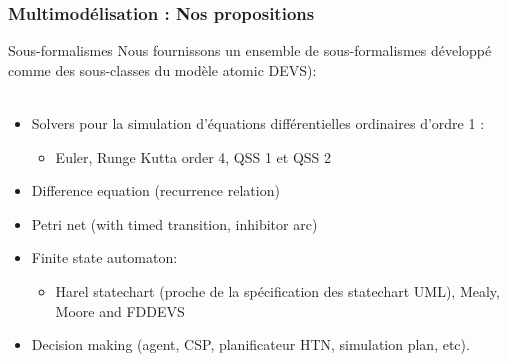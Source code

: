 \documentclass[xetex, compress, table, dvipsnames]{beamer}
\begin{document}
\begin{frame}
  \frametitle{Multimodélisation : Nos propositions}
  \begin{block}{Sous-formalismes}
    Nous fournissons un ensemble de sous-formalismes développé comme
    des sous-classes du modèle atomic DEVS):\\~\\
    \begin{itemize}
    \item Solvers pour la \alert{simulation d'équations
        différentielles ordinaires d'ordre 1} :
      \begin{itemize}
      \item Euler, Runge Kutta order 4, QSS 1 et QSS 2
      \end{itemize}
    \item \alert{Difference equation} (recurrence relation)
    \item \alert{Petri net} (with timed transition, inhibitor arc)
    \item \alert{Finite state automaton}:
      \begin{itemize}
      \item Harel statechart (proche de la spécification des
        statechart UML), Mealy, Moore and FDDEVS
      \end{itemize}
    \item \alert{Decision making} (agent, CSP, planificateur HTN,
      simulation plan, etc).
    \end{itemize}
  \end{block}
\end{frame}
\end{document}

